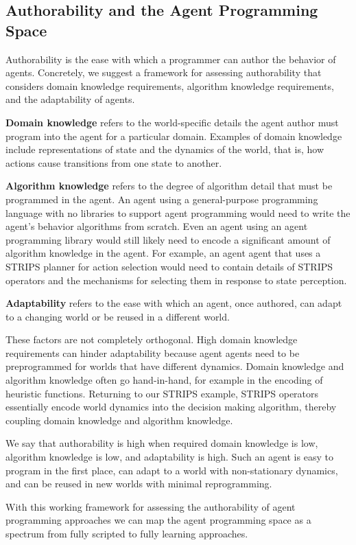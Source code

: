 \subsection{Authorability and the Agent Programming Space}

Authorability is the ease with which a programmer can author the behavior of agents.  Concretely, we suggest a framework for assessing authorability that considers domain knowledge requirements, algorithm knowledge requirements, and the adaptability of agents.

{\bf Domain knowledge} refers to the world-specific details the agent author must program into the agent for a particular domain.  Examples of domain knowledge include representations of state and the dynamics of the world, that is, how actions cause transitions from one state to another.

{\bf Algorithm knowledge} refers to the degree of algorithm detail that must be programmed in the agent.  An agent using a general-purpose programming language with no libraries to support agent programming would need to write the agent's behavior algorithms from scratch. Even an agent using an agent programming library would still likely need to encode a significant amount of algorithm knowledge in the agent. For example, an agent agent that uses a STRIPS planner for action selection would need to contain details of STRIPS operators and the mechanisms for selecting them in response to state perception.

{\bf Adaptability} refers to the ease with which an agent, once authored, can adapt to a changing world or be reused in a different world.

These factors are not completely orthogonal.  High domain knowledge requirements can hinder adaptability because agent agents need to be preprogrammed for worlds that have different dynamics.  Domain knowledge and algorithm knowledge often go hand-in-hand, for example in the encoding of heuristic functions.  Returning to our STRIPS example, STRIPS operators essentially encode world dynamics into the decision making algorithm, thereby coupling domain knowledge and algorithm knowledge.

We say that authorability is high when required domain knowledge is low, algorithm knowledge is low, and adaptability is high.  Such an agent is easy to program in the first place, can adapt to a world with non-stationary dynamics, and can be reused in new worlds with minimal reprogramming.

With this working framework for assessing the authorability of agent programming approaches we can map the agent programming space as a spectrum from fully scripted to fully learning approaches.

